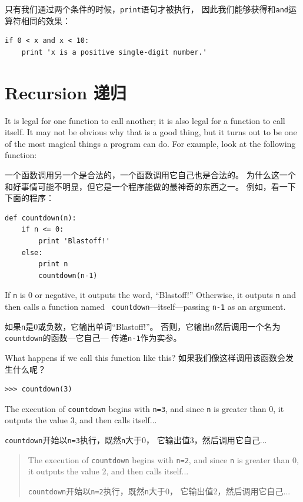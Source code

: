 \documentclass[10pt]{book}
\begin{document}
\begin{CJK}{UTF8}{gbsn}
只有我们通过两个条件的时候，{\tt print}语句才被执行，
因此我们能够获得和{\tt and}运算符相同的效果：

\begin{verbatim}
if 0 < x and x < 10:
    print 'x is a positive single-digit number.'
\end{verbatim}


\section{Recursion 递归}
\label{recursion}

It is legal for one function to call another;
it is also legal for a function to call itself.  It may not be obvious
why that is a good thing, but it turns out to be one of the most
magical things a program can do.
For example, look at the following function:

一个函数调用另一个是合法的，一个函数调用它自己也是合法的。
为什么这一个和好事情可能不明显，但它是一个程序能做的最神奇的东西之一。
例如，看一下下面的程序：

\begin{verbatim}
def countdown(n):
    if n <= 0:
        print 'Blastoff!'
    else:
        print n
        countdown(n-1)
\end{verbatim}
%
If {\tt n} is 0 or negative, it outputs the word, ``Blastoff!''
Otherwise, it outputs {\tt n} and then calls a function named {\tt
countdown}---itself---passing {\tt n-1} as an argument.

如果{\tt n}是0或负数，它输出单词``Blastoff!''。
否则，它输出{\tt n}然后调用一个名为{\tt countdown}的函数---它自己---
传递{\tt n-1}作为实参。

What happens if we call this function like this?
如果我们像这样调用该函数会发生什么呢？

\begin{verbatim}
>>> countdown(3)
\end{verbatim}
%
The execution of {\tt countdown} begins with {\tt n=3}, and since
{\tt n} is greater than 0, it outputs the value 3, and then calls itself...

{\tt countdown}开始以{\tt n=3}执行，既然{\tt n}大于0，
它输出值3，然后调用它自己...

\begin{quote}
The execution of {\tt countdown} begins with {\tt n=2}, and since
{\tt n} is greater than 0, it outputs the value 2, and then calls itself...

{\tt countdown}开始以{\tt n=2}执行，既然{\tt n}大于0，
它输出值2，然后调用它自己...


\end{quote}
\end{CJK}
\end{document}
